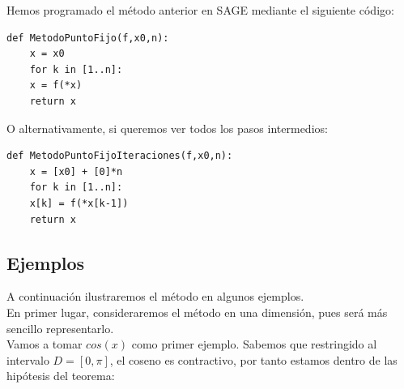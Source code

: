 Hemos programado el método anterior en SAGE mediante el siguiente código:

\begin{verbatim}
def MetodoPuntoFijo(f,x0,n):
	x = x0
	for k in [1..n]:
	x = f(*x)
	return x
\end{verbatim}

O alternativamente, si queremos ver todos los pasos intermedios:
\begin{verbatim}
def MetodoPuntoFijoIteraciones(f,x0,n):
	x = [x0] + [0]*n
	for k in [1..n]:
	x[k] = f(*x[k-1])
	return x
\end{verbatim}

\subsection{Ejemplos}

A continuación ilustraremos el método en algunos ejemplos. \\
En primer lugar, consideraremos el método en una dimensión, pues será más sencillo representarlo. \\
Vamos a tomar $cos(x)$ como primer ejemplo. Sabemos que restringido al intervalo $D = [0,\pi]$, el coseno es contractivo, por tanto estamos dentro de las hipótesis del teorema:

